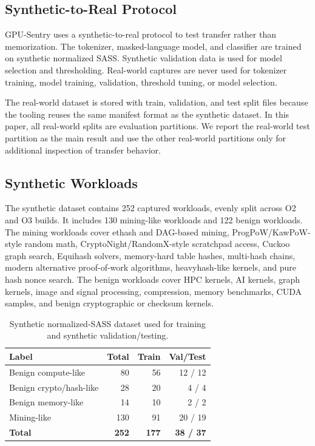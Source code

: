 \subsection{Synthetic-to-Real Protocol}

GPU-Sentry uses a synthetic-to-real protocol to test transfer rather than memorization. The tokenizer, masked-language model, and classifier are trained on synthetic normalized SASS. Synthetic validation data is used for model selection and thresholding. Real-world captures are never used for tokenizer training, model training, validation, threshold tuning, or model selection.

The real-world dataset is stored with train, validation, and test split files because the tooling reuses the same manifest format as the synthetic dataset. In this paper, all real-world splits are evaluation partitions. We report the real-world test partition as the main result and use the other real-world partitions only for additional inspection of transfer behavior.

\subsection{Synthetic Workloads}

The synthetic dataset contains 252 captured workloads, evenly split across O2 and O3 builds. It includes 130 mining-like workloads and 122 benign workloads. The mining workloads cover ethash and DAG-based mining, ProgPoW/KawPoW-style random math, CryptoNight/RandomX-style scratchpad access, Cuckoo graph search, Equihash solvers, memory-hard table hashes, multi-hash chains, modern alternative proof-of-work algorithms, heavyhash-like kernels, and pure hash nonce search. The benign workloads cover HPC kernels, AI kernels, graph kernels, image and signal processing, compression, memory benchmarks, CUDA samples, and benign cryptographic or checksum kernels.

\begin{table}[t]
    \centering
    \caption{Synthetic normalized-SASS dataset used for training and synthetic validation/testing.}
    \label{tab:synthetic_dataset}
    \footnotesize
    \begin{tabular}{lrrr}
        \toprule
        Label & Total & Train & Val/Test \\
        \midrule
        Benign compute-like & 80 & 56 & 12 / 12 \\
        Benign crypto/hash-like & 28 & 20 & 4 / 4 \\
        Benign memory-like & 14 & 10 & 2 / 2 \\
        Mining-like & 130 & 91 & 20 / 19 \\
        \midrule
        \textbf{Total} & \textbf{252} & \textbf{177} & \textbf{38 / 37} \\
        \bottomrule
    \end{tabular}
\end{table}

